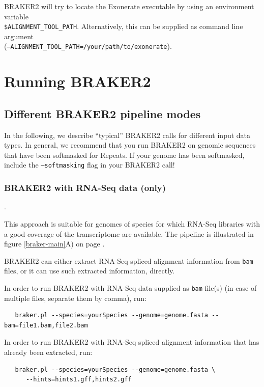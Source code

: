 \documentclass[a4paper,10pt]{report}
\begin{document}
BRAKER2 will try to locate the Exonerate executable by using an environment variable \\\texttt{\$ALIGNMENT\_TOOL\_PATH}. Alternatively, this can be supplied as command line argument \\(\texttt{--ALIGNMENT\_TOOL\_PATH=/your/path/to/exonerate}).

\chapter{Running BRAKER2}

\section{Different BRAKER2 pipeline modes}

In the following, we describe ``typical'' BRAKER2 calls for different input data types. In general, we recommend that you run BRAKER2 on genomic sequences that have been softmasked for Repeats. If your genome has been softmasked, include the \texttt{--softmasking} flag in your BRAKER2 call!

\subsection{BRAKER2 with RNA-Seq data (only)}\label{braker1}.

This approach is suitable for genomes of species for which RNA-Seq libraries with a good coverage of the transcriptome are available. The pipeline is illustrated in figure \ref{braker-main}A) on page \pageref{braker-main}.

BRAKER2 can either extract RNA-Seq spliced alignment information from \texttt{bam} files, or it can use such extracted information, directly.

In order to run BRAKER2 with RNA-Seq data supplied as \texttt{bam} file(s) (in case of multiple files, separate them by comma), run:

\begin{verbatim}
   braker.pl --species=yourSpecies --genome=genome.fasta --bam=file1.bam,file2.bam
\end{verbatim}

In order to run BRAKER2 with RNA-Seq spliced alignment information that has already been extracted, run:

\begin{verbatim}
   braker.pl --species=yourSpecies --genome=genome.fasta \
      --hints=hints1.gff,hints2.gff
\end{verbatim}
\end{document}
